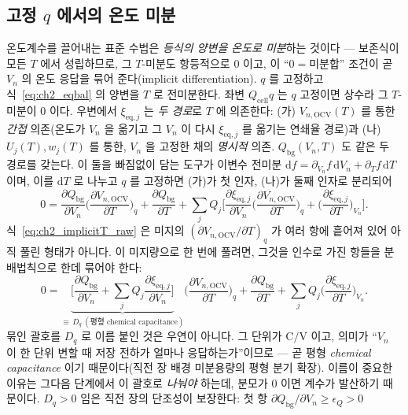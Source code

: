 \documentclass[11pt,a4paper]{article}
\newcommand{\dd}{\mathrm{d}}
\newcommand{\eq}{\mathrm{eq}}
\newcommand{\cell}{\mathrm{cell}}
\newcommand{\bg}{\mathrm{bg}}
\newcommand{\OCV}{\mathrm{OCV}}
\begin{document}
\subsection{고정 $q$ 에서의 온도 미분}
온도계수를 끌어내는 표준 수법은 \emph{등식의 양변을 온도로 미분}하는 것이다 — 보존식이 모든 $T$ 에서 성립하므로,
그 $T$-미분도 항등적으로 $0$ 이고, 이 ``$0=$미분합'' 조건이 곧 $V_n$ 의 온도 응답을 묶어 준다(implicit
differentiation). $q$ 를 고정하고 식~\eqref{eq:ch2_eqbal} 의 양변을 $T$ 로 전미분한다. 좌변 $Q_\cell q$ 는 $q$
고정이면 상수라 그 $T$-미분이 $0$ 이다. 우변에서 $\xi_{\eq,j}$ 는 \emph{두 경로}로 $T$ 에 의존한다: (가)
$V_{n,\OCV}(T)$ 를 통한 \emph{간접} 의존(온도가 $V_n$ 을 옮기고 그 $V_n$ 이 다시 $\xi_{\eq,j}$ 를 옮기는 연쇄율
경로)과 (나) $U_j(T),w_j(T)$ 를 통한, $V_n$ 을 고정한 채의 \emph{명시적} 의존. $Q_\bg(V_n,T)$ 도 같은 두 경로를
갖는다. 이 둘을 빠짐없이 담는 도구가 이변수 전미분 $\dd f=\partial_{V_n}f\,\dd V_n+\partial_T f\,\dd T$ 이며, 이를
$\dd T$ 로 나누고 $q$ 를 고정하면 (가)가 첫 인자, (나)가 둘째 인자로 분리되어
\begin{equation}
0=\frac{\partial Q_\bg}{\partial V_n}\Big(\frac{\partial V_{n,\OCV}}{\partial T}\Big)_q+\frac{\partial Q_\bg}{\partial T}
+\sum_{j}Q_{j}\Big[\frac{\partial\xi_{\eq,j}}{\partial V_n}\Big(\frac{\partial V_{n,\OCV}}{\partial T}\Big)_q
+\Big(\frac{\partial\xi_{\eq,j}}{\partial T}\Big)_{V_n}\Big].
\label{eq:ch2_implicitT_raw}
\end{equation}
식~\eqref{eq:ch2_implicitT_raw} 은 미지의 $(\partial V_{n,\OCV}/\partial T)_q$ 가 여러 항에 흩어져 있어 아직 풀린
형태가 아니다. 이 미지량으로 한 번에 풀려면, 그것을 인수로 가진 항들을 분배법칙으로 한데 묶어야 한다:
\begin{equation}
0=\underbrace{\Big[\frac{\partial Q_\bg}{\partial V_n}+\sum_{j}Q_{j}\frac{\partial\xi_{\eq,j}}{\partial V_n}\Big]}_{\equiv\,D_q\ (\text{평형 chemical capacitance})}
\Big(\frac{\partial V_{n,\OCV}}{\partial T}\Big)_q
+\frac{\partial Q_\bg}{\partial T}+\sum_{j}Q_{j}\Big(\frac{\partial\xi_{\eq,j}}{\partial T}\Big)_{V_n}.
\label{eq:ch2_implicitT}
\end{equation}
묶인 괄호를 $D_q$ 로 이름 붙인 것은 우연이 아니다. 그 단위가 $\mathrm{C/V}$ 이고, 의미가 ``$V_n$ 이 한 단위 변할 때
저장 전하가 얼마나 응답하는가''이므로 — 곧 평형 \emph{chemical capacitance} 이기 때문이다(직전 장 배경
미분용량의 평형 분기 확장). 이름이 중요한 이유는 그다음 단계에서 이 괄호로 \emph{나눠야} 하는데, 분모가 $0$ 이면
계수가 발산하기 때문이다. $D_q>0$ 임은 직전 장의 단조성이 보장한다: 첫 항 $\partial Q_\bg/\partial V_n\ge\epsilon_Q>0$
\end{document}
